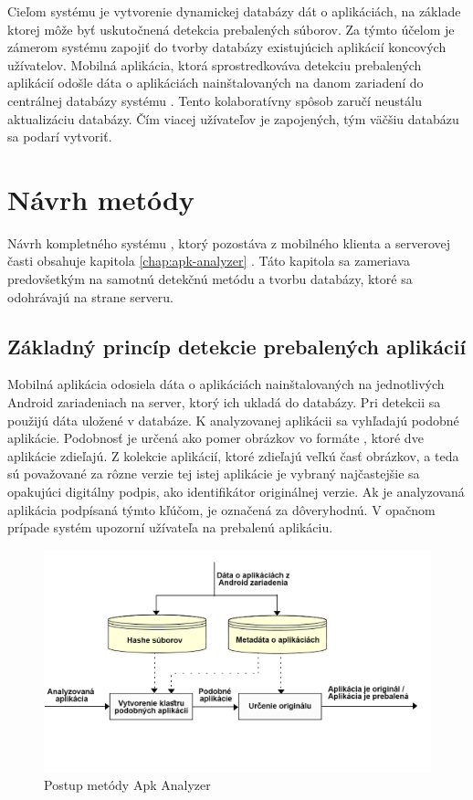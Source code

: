 Cieľom systému  je vytvorenie dynamickej databázy dát o aplikáciách, na základe ktorej môže byť uskutočnená detekcia prebalených súborov.
Za týmto účelom je zámerom systému  zapojiť do tvorby databázy existujúcich aplikácií koncových užívatelov. Mobilná aplikácia, ktorá sprostredkováva detekciu prebalených aplikácií odošle dáta o aplikáciách nainštalovaných na danom zariadení do centrálnej databázy systému . Tento kolaboratívny spôsob zaručí neustálu aktualizáciu databázy. Čím viacej užívateľov je zapojených, tým väčšiu databázu sa podarí vytvoriť.

\section{Návrh metódy}
Návrh kompletného systému , ktorý pozostáva z mobilného klienta a serverovej časti obsahuje kapitola \ref{chap:apk-analyzer} . Táto kapitola sa zameriava predovšetkým na samotnú detekčnú metódu a tvorbu databázy, ktoré sa odohrávajú na strane serveru.

\subsection{Základný princíp detekcie prebalených aplikácií}
Mobilná aplikácia  odosiela dáta o aplikáciách nainštalovaných na jednotlivých Android zariadeniach na server, ktorý ich ukladá do databázy. Pri detekcii sa použijú dáta uložené v databáze. K analyzovanej aplikácii sa vyhľadajú podobné aplikácie. Podobnosť je určená ako pomer obrázkov vo formáte , ktoré dve aplikácie zdieľajú. Z kolekcie aplikácií, ktoré zdieľajú veľkú časť obrázkov, a teda sú považované za rôzne verzie tej istej aplikácie je vybraný najčastejšie sa opakujúci digitálny podpis, ako identifikátor originálnej verzie. Ak je analyzovaná aplikácia podpísaná týmto kľúčom, je označená za dôveryhodnú. V opačnom prípade systém upozorní užívateľa na prebalenú aplikáciu. 

\begin{figure}[htb]
  \begin{center}
    \includegraphics[width=130mm]{images/detection-overview.png}
  \end{center}
  \caption{Postup metódy Apk Analyzer}
  \label{fig:metódaApkAnalyzer}
\end{figure}


